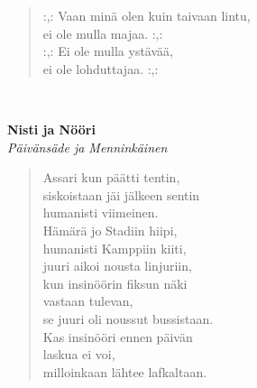 \noindent\begin{minipage}{\linewidth}
\begin{verse}
	\hspace{0pt-\widthof{:,: }}:,: Vaan minä olen kuin taivaan lintu,\\
	ei ole mulla majaa. :,:\\
	\hspace{0pt-\widthof{:,: }}:,: Ei ole mulla ystävää,\\
	ei ole lohduttajaa. :,:\\
\end{verse}
\end{minipage}\\[10pt]
%
%
\noindent\begin{minipage}{\linewidth}
\vspace{5pt}
\parbox[t]{0.85\linewidth}{\raggedright {\large\bf Nisti ja Nööri}\\[2pt]\small\emph{Päivänsäde ja Menninkäinen}\\[6pt]}
\begin{verse}
	
	Assari kun päätti tentin,\\
	siskoistaan jäi jälkeen sentin\\
	humanisti viimeinen.\\
	Hämärä jo Stadiin hiipi,\\
	humanisti Kamppiin kiiti,\\
	juuri aikoi nousta linjuriin,\\
	kun insinöörin fiksun näki\\
	vastaan tulevan,\\
	se juuri oli noussut bussistaan.\\
	Kas insinööri ennen päivän\\
	laskua ei voi,\\
	milloinkaan lähtee lafkaltaan.\\
\end{verse}
\end{minipage}\\[10pt]
